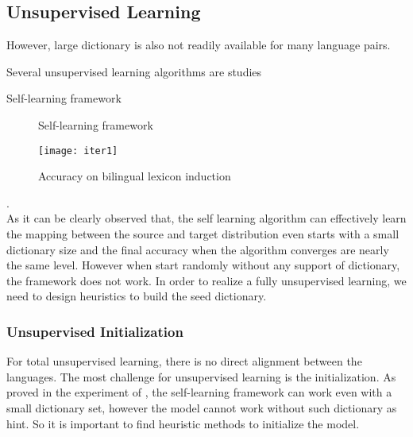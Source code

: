 	\subsection{Unsupervised Learning}
	However, large dictionary is also not readily available for many language pairs.
	
	Several unsupervised learning algorithms are studies   
	
	Self-learning framework\\
	
	\begin{figure}[ht]
		\centering
		\begin{minipage}{.7\linewidth}
			\begin{algorithm}[H]
				\SetAlgoLined
				
				\caption{Self-learning framework}
			\end{algorithm}
		\end{minipage}
	\end{figure}
	
	
	\begin{figure}[t]
		\texttt{[image: iter1]}
		\centering
		\caption{Accuracy on bilingual lexicon induction}
	\end{figure}
	
	\cite{artetxe2018robust}.\\As it can be clearly observed that, the self learning algorithm can effectively learn the mapping between the source and target distribution even starts with a small dictionary size and the final accuracy when the algorithm converges are nearly the same level. However when start randomly without any support of dictionary, the framework does not work. In order to realize a fully unsupervised learning, we need to design heuristics to build the seed dictionary.
	
	\subsubsection{Unsupervised Initialization}
	For total unsupervised learning, there is no direct alignment between the languages. 	The most challenge for unsupervised learning is the initialization. As proved in the experiment of \cite{}, the self-learning framework can work even with a small dictionary set, however the model cannot work without such dictionary as hint.  So it is important to find heuristic methods to initialize the model.
	
